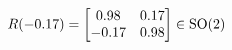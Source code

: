 \documentclass[preview]{standalone}
\begin{document}
\begin{align*}
\special{dvisvgm:raw <g id='unique000'>}R(-0.17) = \begin{bmatrix} 0.98 & 0.17 \\ -0.17 & 0.98 \end{bmatrix} \in \text{SO}(2)\special{dvisvgm:raw </g>}
\end{align*}
\end{document}
